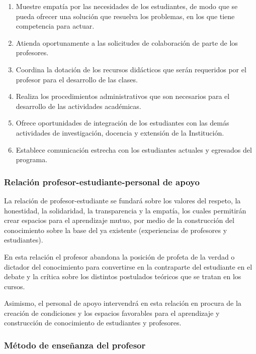 \begin{enumerate}
\item Muestre empatía por las necesidades de los estudiantes, de modo que se pueda ofrecer una solución que resuelva los problemas, en los que tiene competencia para actuar.
\item Atienda oportunamente a las solicitudes de colaboración de parte de los profesores.
\item Coordina la dotación de los recursos didácticos que serán requeridos por el profesor para el desarrollo de las clases.
\item Realiza los procedimientos administrativos que son necesarios para el desarrollo de las actividades académicas.
\item Ofrece oportunidades de integración de los estudiantes con las demás actividades de investigación, docencia y extensión de la Institución.
\item Establece comunicación estrecha con los estudiantes actuales y egresados del programa.
\end{enumerate}
\subsubsection*{Relación profesor-estudiante-personal de apoyo}

La relación de profesor-estudiante se fundará sobre los valores del respeto, la honestidad, la solidaridad, la transparencia y la empatía, los cuales permitirán crear espacios para el aprendizaje mutuo, por medio de la construcción del conocimiento sobre la base del ya existente (experiencias de profesores y estudiantes).\par

En esta relación el profesor abandona la posición de profeta de la verdad o dictador del conocimiento para convertirse en la contraparte del estudiante en el debate y la crítica sobre los distintos postulados teóricos que se tratan en los cursos.\par

Asimismo, el personal de apoyo intervendrá en esta relación en procura de la creación de condiciones y los espacios favorables para el aprendizaje y construcción de conocimiento de estudiantes y profesores.\par

\subsubsection*{Método de enseñanza del profesor}

